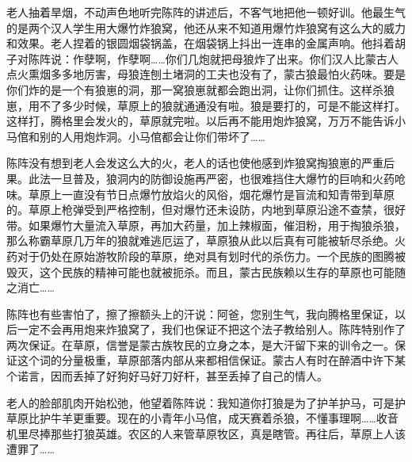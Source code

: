 \par 老人抽着旱烟，不动声色地听完陈阵的讲述后，不客气地把他一顿好训。他最生气的是两个汉人学生用大爆竹炸狼窝，他还从来不知道用爆竹炸狼窝有这么大的威力和效果。老人捏着的银圆烟袋锅盖，在烟袋锅上抖出一连串的金属声响。他抖着胡子对陈阵说：作孽啊，作孽啊……你们几炮就把母狼炸了出来。你们汉人比蒙古人点火熏烟多多地厉害，母狼连刨土堵洞的工夫也没有了，蒙古狼最怕火药味。要是你们炸的是一个有狼崽的洞，那一窝狼崽就都会跑出洞，让你们抓住。这样杀狼崽，用不了多少时候，草原上的狼就通通没有啦。狼是要打的，可是不能这样打。这样打，腾格里会发火的，草原就完啦。以后再不能用炮炸狼窝，万万不能告诉小马倌和别的人用炮炸洞。小马倌都会让你们带坏了……
\par 陈阵没有想到老人会发这么大的火，老人的话也使他感到炸狼窝掏狼崽的严重后果。此法一旦普及，狼洞内的防御设施再严密，也很难挡住大爆竹的巨响和火药呛味。草原上一直没有节日点爆竹放焰火的风俗，烟花爆竹是盲流和知青带到草原的。草原上枪弹受到严格控制，但对爆竹还未设防，内地到草原沿途不查禁，很好带。如果爆竹大量流入草原，再加大药量，加上辣椒面，催泪粉，用于掏狼杀狼，那么称霸草原几万年的狼就难逃厄运了，草原狼从此以后真有可能被斩尽杀绝。火药对于仍处在原始游牧阶段的草原，绝对具有划时代的杀伤力。一个民族的图腾被毁灭，这个民族的精神可能也就被扼杀。而且，蒙古民族赖以生存的草原也可能随之消亡……
\par 陈阵也有些害怕了，擦了擦额头上的汗说：阿爸，您别生气，我向腾格里保证，以后一定不会再用炮来炸狼窝了，我们也保证不把这个法子教给别人。陈阵特别作了两次保证。在草原，信誉是蒙古族牧民的立身之本，是大汗留下来的训令之一。保证这个词的分量极重，草原部落内部从来都相信保证。蒙古人有时在醉酒中许下某个诺言，因而丢掉了好狗好马好刀好杆，甚至丢掉了自己的情人。
\par 老人的脸部肌肉开始松弛，他望着陈阵说：我知道你打狼是为了护羊护马，可是护草原比护牛羊更重要。现在的小青年小马倌，成天赛着杀狼，不懂事理啊……收音机里尽捧那些打狼英雄。农区的人来管草原牧区，真是瞎管。再往后，草原上人该遭罪了……
